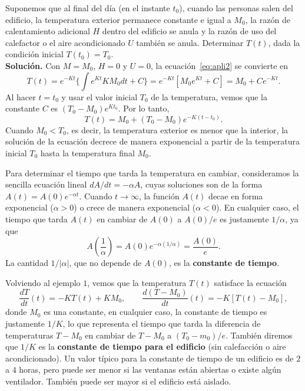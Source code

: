 \begin{ejemplo}
	Suponemos que al final del día (en el instante $t_0$), cuando las personas salen del edificio, la temperatura exterior permanece constante e igual a $M_0$, la razón de calentamiento adicional $H$ dentro del edificio se anula y la razón de uso del calefactor o el aire acondicionado $U$ también se anula. Determinar $T(t)$, dada la condición inicial $T(t_0) = T_0$.\\
	\textbf{Solución.} Con $M = M_0$, $H = 0$ y $U = 0$, la ecuación~\eqref{eq:apli2} se convierte en
	\begin{equation}
		T(t) = e^{-Kt}\{\int e^{Kt}KM_0dt+C\} = e^{-Kt}[M_0e^{Kt}+C] = M_0 + Ce^{-Kt}.
	\end{equation}
	Al hacer $t = t_0$ y usar el valor inicial $T_0$ de la temperatura, vemos que la constante $C$ es $(T_0 - M_0)e^{Kt_0}$. Por lo tanto,
	\begin{equation}
		T(t) = M_0 + (T_0 - M_0)e^{-K(t-t_0)}.
	\end{equation}
	Cuando $M_0 < T_0$, es decir, la temperatura exterior es menor que la interior, la solución de la ecuación decrece de manera exponencial a partir de la temperatura inicial $T_0$ hasta la temperatura final $M_0$.
	\begin{observacion}
		Para determinar el tiempo que tarda la temperatura en cambiar, consideramos la sencilla ecuación lineal $dA/dt = -\alpha A$, cuyas soluciones son de la forma $A(t) = A(0)e^{-\alpha t}$. Cuando $t \rightarrow \infty$, la función $A(t)$ decae en forma exponencial ($\alpha > 0$) o crece de manera exponencial ($\alpha < 0$). En cualquier caso, el tiempo que tarda $A(t)$ en cambiar de $A(0)$ a $A(0)/e$ es justamente $1/\alpha$, ya que
		\begin{equation}
			A(\dfrac{1}{\alpha}) = A(0)e^{-\alpha (1/\alpha)} = \dfrac{A(0)}{e}.
		\end{equation}
		La cantidad $1/|\alpha|$, que no depende de $A(0)$, es la \textbf{constante de tiempo}.
	\end{observacion}
	Volviendo al ejemplo $1$, vemos que la temperatura $T(t)$ satisface la ecuación
	\begin{equation}
		\dfrac{dT}{dt}(t) = -KT(t)+KM_0, \qquad \dfrac{d(T-M_0)}{dt}(t) = -K[T(t)-M_0],
	\end{equation}
	donde $M_0$ es una constante, en cualquier caso, la constante de tiempo es justamente $1/K$, lo que representa el tiempo que tarda la diferencia de temperaturas $T-M_0$ en cambiar de $T-M_0$ a $(T_0 - m_0)/e$. También diremos que $1/K$ es la \textbf{constante de tiempo para el edificio} (sin calefacción o aire acondicionado). Un valor típico para la constante de tiempo de un edificio es de $2$ a $4$ horas, pero puede ser menor si las ventanas están abiertas o existe algún ventilador. También puede ser mayor si el edificio está aislado.
	

\end{ejemplo}
